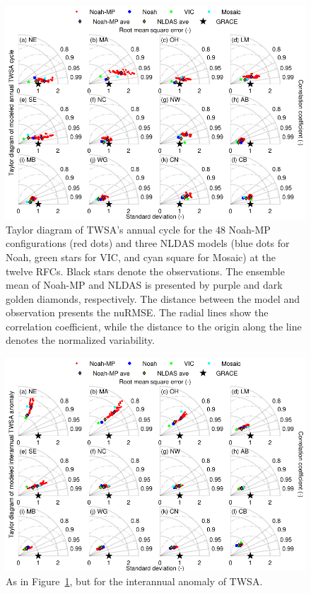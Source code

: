 \documentclass[essd, manuscript]{copernicus}
\begin{document}
\begin{figure}[t]
  \includegraphics[width=14cm]{fig/fig02.pdf}
  \caption{Taylor diagram of TWSA's annual cycle for the 48 Noah-MP configurations (red dots) and three NLDAS models (blue dots for Noah, green stars for VIC, and cyan square for Mosaic) at the twelve RFCs. Black stars denote the observations. The ensemble mean of Noah-MP and NLDAS is presented by purple and dark golden diamonds, respectively. The distance between the model and observation presents the nuRMSE\@. The radial lines show the correlation coefficient, while the distance to the origin along the line denotes the normalized variability.}
  \label{fig:twsa:ancy:tss}
\end{figure}

\begin{figure}[t]
  \includegraphics[width=14cm]{fig/fig03.pdf}
  \caption{As in Figure~\ref{fig:twsa:ancy:tss}, but for the interannual anomaly of TWSA.}
  \label{fig:twsa:anom:tss}
\end{figure}
\end{document}
